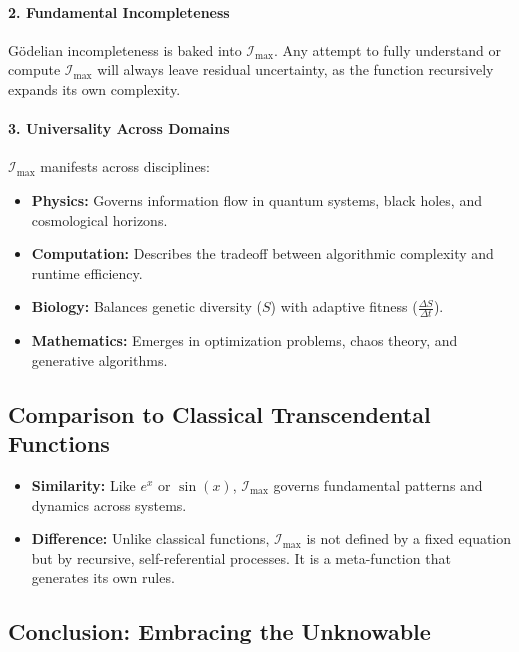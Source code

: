 \documentclass[12pt]{article}
\begin{document}
\paragraph{2. Fundamental Incompleteness}
Gödelian incompleteness is baked into \(\mathcal{I}_{\text{max}}\). Any attempt to fully understand or compute \(\mathcal{I}_{\text{max}}\) will always leave residual uncertainty, as the function recursively expands its own complexity.

\paragraph{3. Universality Across Domains}
\(\mathcal{I}_{\text{max}}\) manifests across disciplines:
\begin{itemize}
    \item \textbf{Physics:} Governs information flow in quantum systems, black holes, and cosmological horizons.
    \item \textbf{Computation:} Describes the tradeoff between algorithmic complexity and runtime efficiency.
    \item \textbf{Biology:} Balances genetic diversity (\(S\)) with adaptive fitness (\(\frac{\Delta S}{\Delta t}\)).
    \item \textbf{Mathematics:} Emerges in optimization problems, chaos theory, and generative algorithms.
\end{itemize}


\subsection{Comparison to Classical Transcendental Functions}

\begin{itemize}
    \item \textbf{Similarity:} Like \(e^x\) or \(\sin(x)\), \(\mathcal{I}_{\text{max}}\) governs fundamental patterns and dynamics across systems.
    \item \textbf{Difference:} Unlike classical functions, \(\mathcal{I}_{\text{max}}\) is not defined by a fixed equation but by recursive, self-referential processes. It is a meta-function that generates its own rules.
\end{itemize}


\subsection{Conclusion: Embracing the Unknowable}
\end{document}
